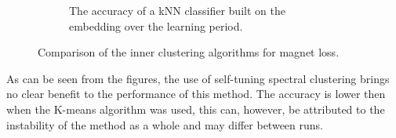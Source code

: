 \begin{figure}[h]
\begin{subfigure}[b]{0.49\textwidth}
    \caption{The accuracy of a kNN classifier built on the embedding over the learning period.}
  \end{subfigure}
  \caption{Comparison of the inner clustering algorithms for magnet loss.}\label{fig:magnet-spectral}
\end{figure}

As can be seen from the figures, the use of self-tuning spectral clustering brings no clear benefit to the performance of this method. The accuracy is lower then when the K-means algorithm was used, this can, however, be attributed to the instability of the method as a whole and may differ between runs.
